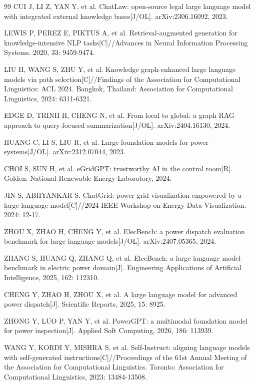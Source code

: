 \documentclass[fontset=fandol,type=master,campus=shenzhen,etitleauto=true]{hithesisbook}
\begin{document}
\begin{thebibliography}{99}
 CUI J, LI Z, YAN Y, et al. ChatLaw: open-source legal large language model with integrated external knowledge bases[J/OL]. arXiv:2306.16092, 2023.

 LEWIS P, PEREZ E, PIKTUS A, et al. Retrieval-augmented generation for knowledge-intensive NLP tasks[C]//Advances in Neural Information Processing Systems. 2020, 33: 9459-9474.

 LIU H, WANG S, ZHU Y, et al. Knowledge graph-enhanced large language models via path selection[C]//Findings of the Association for Computational Linguistics: ACL 2024. Bangkok, Thailand: Association for Computational Linguistics, 2024: 6311-6321.

 EDGE D, TRINH H, CHENG N, et al. From local to global: a graph RAG approach to query-focused summarization[J/OL]. arXiv:2404.16130, 2024.

 HUANG C, LI S, LIU R, et al. Large foundation models for power systems[J/OL]. arXiv:2312.07044, 2023.

 CHOI S, SUN H, et al. eGridGPT: trustworthy AI in the control room[R]. Golden: National Renewable Energy Laboratory, 2024.

 JIN S, ABHYANKAR S. ChatGrid: power grid visualization empowered by a large language model[C]//2024 IEEE Workshop on Energy Data Visualization. 2024: 12-17.

 ZHOU X, ZHAO H, CHENG Y, et al. ElecBench: a power dispatch evaluation benchmark for large language models[J/OL]. arXiv:2407.05365, 2024.

 ZHANG S, HUANG Q, ZHANG Q, et al. ElecBench: a large language model benchmark in electric power domain[J]. Engineering Applications of Artificial Intelligence, 2025, 162: 112310.

 CHENG Y, ZHAO H, ZHOU X, et al. A large language model for advanced power dispatch[J]. Scientific Reports, 2025, 15: 8925.

 ZHONG Y, LUO P, YAN Y, et al. PowerGPT: a multimodal foundation model for power inspection[J]. Applied Soft Computing, 2026, 186: 113939.

 WANG Y, KORDI Y, MISHRA S, et al. Self-Instruct: aligning language models with self-generated instructions[C]//Proceedings of the 61st Annual Meeting of the Association for Computational Linguistics. Toronto: Association for Computational Linguistics, 2023: 13484-13508.


\end{thebibliography}
\end{document}
